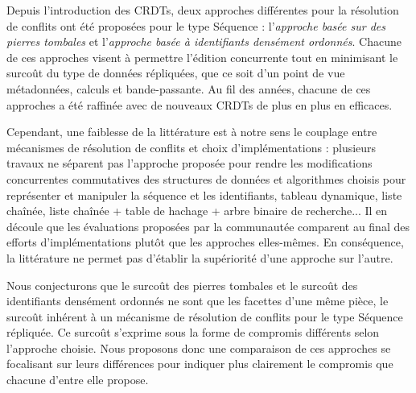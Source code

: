 \label{sec:seq-crdts-synth}

Depuis l'introduction des \acp{CRDT}, deux approches différentes pour la résolution de conflits ont été proposées pour le type Séquence : l'\emph{approche basée sur des pierres tombales} et l'\emph{approche basée à identifiants densément ordonnés}.
Chacune de ces approches visent à permettre l'édition concurrente tout en minimisant le surcoût du type de données répliquées, que ce soit d'un point de vue métadonnées, calculs et bande-passante.
Au fil des années, chacune de ces approches a été raffinée avec de nouveaux \acp{CRDT} de plus en plus en efficaces.

Cependant, une faiblesse de la littérature est à notre sens le couplage entre mécanismes de résolution de conflits et choix d'implémentations : plusieurs travaux \cite{2009-treedoc-preguica, 2009-logoot-weiss, 2013-logootsplit,briot:hal-01343941} ne séparent pas l'approche proposée pour rendre les modifications concurrentes commutatives des structures de données et algorithmes choisis pour représenter et manipuler la séquence et les identifiants, \eg tableau dynamique, liste chaînée, liste chaînée + table de hachage + arbre binaire de recherche...
Il en découle que les évaluations proposées par la communautée comparent au final des efforts d'implémentations plutôt que les approches elles-mêmes.
En conséquence, la littérature ne permet pas d'établir la supériorité d'une approche sur l'autre.

Nous conjecturons que le surcoût des pierres tombales et le surcoût des identifiants densément ordonnés ne sont que les facettes d'une même pièce, \ie le surcoût inhérent à un mécanisme de résolution de conflits pour le type Séquence répliquée.
Ce surcoût s'exprime sous la forme de compromis différents selon l'approche choisie.
Nous proposons donc une comparaison de ces approches se focalisant sur leurs différences pour indiquer plus clairement le compromis que chacune d'entre elle propose.

